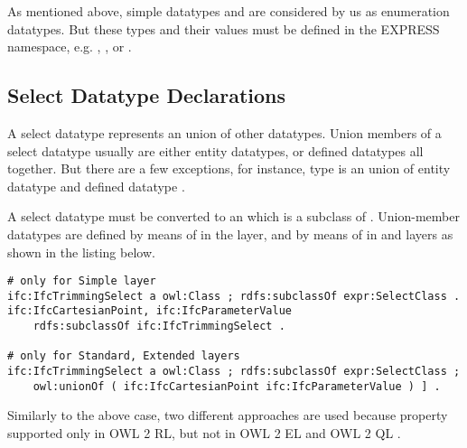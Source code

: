 As mentioned above, simple data\-types  and  are considered by us as enumeration data\-types. But these types and their values must be defined in the EXPRESS namespace, e.g. , ,  or .



\subsection{Select Datatype Declarations}
\label{subsec:ifcOWL-select-types}

A select data\-type represents an union of other data\-types. Union members of a select data\-type usually are either entity data\-types, or defined data\-types all together. But there are a few exceptions, for instance, type  is an union of entity data\-type  and defined data\-type .

\begin{principle}
A select data\-type must be converted to an  which is a subclass of . Union-member data\-types are defined by means of  in the \simple{} layer, and by means of  in \standard{} and \extended{} layers as shown in the listing below.
\end{principle}

\begin{lstlisting}
# only for Simple layer
ifc:IfcTrimmingSelect a owl:Class ; rdfs:subclassOf expr:SelectClass .
ifc:IfcCartesianPoint, ifc:IfcParameterValue
    rdfs:subclassOf ifc:IfcTrimmingSelect .

# only for Standard, Extended layers
ifc:IfcTrimmingSelect a owl:Class ; rdfs:subclassOf expr:SelectClass ;
    owl:unionOf ( ifc:IfcCartesianPoint ifc:IfcParameterValue ) ] .
\end{lstlisting}

Similarly to the above case, two different approaches are used because property  supported only in OWL 2 RL, but not in OWL 2 EL and OWL 2 QL \cite{w3c:owl2-profiles}. 



